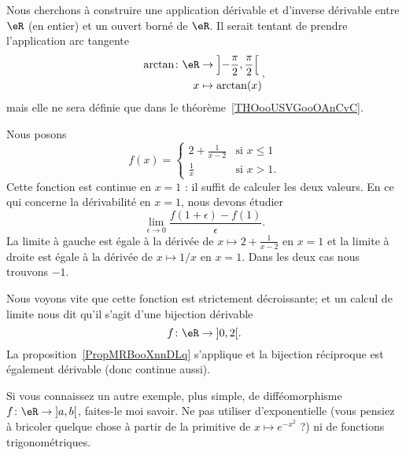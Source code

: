 \begin{example}      \label{EXooGKPNooZtmJen}
	Nous cherchons à construire une application dérivable et d'inverse dérivable entre \( \eR\) (en entier) et un ouvert borné de \( \eR\). Il serait tentant de prendre l'application arc tangente
	\begin{equation}
		\begin{aligned}
			\arctan\colon \eR & \to \left] -\frac{ \pi }{2} , \frac{ \pi }{2} \right[ \\
			x                 & \mapsto \arctan(x)
		\end{aligned},
	\end{equation}
	mais elle ne sera définie que dans le théorème~\ref{THOooUSVGooOAnCvC}.

	Nous posons
    \begin{equation}        \label{EQooOSPIooNWZBCa}
		f(x)=\begin{cases}
			2+\frac{1}{ x-2 } & \text{si } x\leq 1 \\
			\frac{1}{ x }     & \text{si } x>1.
		\end{cases}
	\end{equation}
	Cette fonction est continue en \( x=1\) : il suffit de calculer les deux valeurs. En ce qui concerne la dérivabilité en \( x=1\), nous devons étudier
	\begin{equation}
		\lim_{\epsilon\to 0}\frac{ f(1+\epsilon)-f(1) }{ \epsilon }.
	\end{equation}
	La limite à gauche est égale à la dérivée de \( x\mapsto 2+\frac{ 1 }{ x-2 }\) en \( x=1\) et la limite à droite est égale à la dérivée de \( x\mapsto 1/x\) en \( x=1\). Dans les deux cas nous trouvons \( -1\).

	\begin{center}
		
	\end{center}

	Nous voyons vite que cette fonction est strictement décroissante; et un calcul de limite nous dit qu'il s'agit d'une bijection dérivable
	\begin{equation}
		f\colon \eR\to \mathopen] 0 , 2 \mathclose[.
	\end{equation}
	La proposition~\ref{PropMRBooXnnDLq} s'applique et la bijection réciproque est également dérivable (donc continue aussi).
\end{example}

\begin{probleme}
	Si vous connaissez un autre exemple, plus simple, de difféomorphisme \( f\colon \eR\to \mathopen] a , b \mathclose[\), faites-le moi savoir. Ne pas utiliser d'exponentielle (vous pensiez à bricoler quelque chose à partir de la primitive de \( x\mapsto  e^{-x^2}\) ?) ni de fonctions trigonométriques.
\end{probleme}

